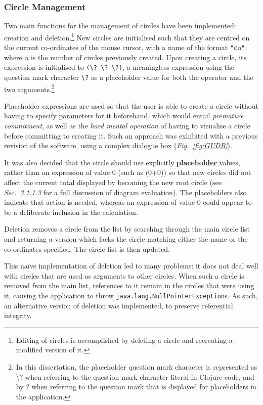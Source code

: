 \documentclass[12pt,twoside,notitlepage,xetex]{report}
\begin{document}
{\subsubsection{Circle Management}

Two main functions for the management of circles have been implemented: creation and deletion.\footnote{Editing of circles is accomplished by deleting a circle and recreating a modified version of it.}  New circles are initialised such that they are centred on the current co-ordinates of the mouse cursor, with a name of the format \verb¬"c¬\emph{n}\verb¬"¬, where \emph{n} is the number of circles previously created.  Upon creating a circle, its expression is initialised to \verb¬(\? \? \?)¬, a meaningless expression using the question mark character \verb¬\?¬ as a placeholder value for both the operator and the two arguments.\footnote{In this dissertation, the placeholder question mark character is represented as {\ttfamily \textbackslash?} when referring to the question mark character literal in Clojure code, and by {\sfapp ?} when referring to the question mark that is displayed for placeholders in the application.}

Placeholder expressions are used so that the user is able to create a circle without having to specify parameters for it beforehand, which would entail \emph{premature commitment}, as well as the \emph{hard mental operation} of having to visualise a circle before committing to creating it.  Such an approach was exhibited with a previous revision of the software, using a complex dialogue box (\emph{Fig.~\ref{fig:GUDB}}).

It was also decided that the circle should use explicitly {\bf placeholder} values, rather than an expression of value 0 (such as (0+0)) so that new circles did not affect the current total displayed by becoming the new root circle (see \emph{Sec.~3.1.1.3} for a full discussion of diagram evaluation).  The placeholders also indicate that action is needed, whereas an expression of value 0 could appear to be a deliberate inclusion in the calculation.

Deletion removes a circle from the list by searching through the main circle list and returning a version which lacks the circle matching either the name or the co-ordinates specified.  The circle list is then updated.

This naïve implementation of deletion led to many problems: it does not deal well with circles that are used as arguments to other circles.  When such a circle is removed from the main list, references to it remain in the circles that were using it, causing the application to throw \verb¬java.lang.NullPointerException¬s.  As such, an alternative version of deletion was implemented, to preserve referential integrity.

}
\end{document}
